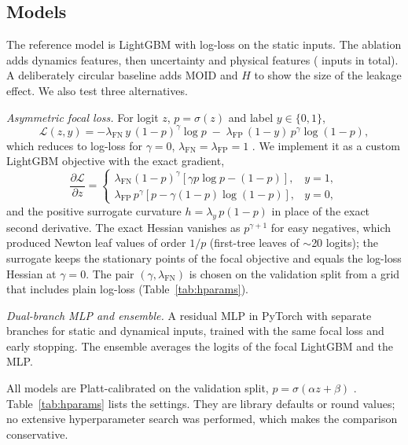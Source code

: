 \documentclass[journal]{IEEEtran}
\begin{document}
\subsection{Models}
The reference model is LightGBM \cite{ke2017} with log-loss on the \NStaticFeat{} static inputs. The ablation adds dynamics features, then uncertainty and physical features (\NFullFeat{} inputs in total). A deliberately circular baseline adds MOID and $H$ to show the size of the leakage effect. We also test three alternatives.

\emph{Asymmetric focal loss.} For logit $z$, $p=\sigma(z)$ and label $y\in\{0,1\}$,
\begin{equation}
\mathcal{L}(z,y) = -\lambda_{\mathrm{FN}}\, y\,(1-p)^{\gamma}\log p \;-\; \lambda_{\mathrm{FP}}\,(1-y)\,p^{\gamma}\log(1-p),
\end{equation}
which reduces to log-loss for $\gamma=0$, $\lambda_{\mathrm{FN}}=\lambda_{\mathrm{FP}}=1$ \cite{lin2017}. We implement it as a custom LightGBM objective with the exact gradient,
\begin{equation}
\frac{\partial\mathcal{L}}{\partial z} =
\begin{cases}
\lambda_{\mathrm{FN}}(1-p)^{\gamma}\left[\gamma p\log p-(1-p)\right], & y=1,\\
\lambda_{\mathrm{FP}}\,p^{\gamma}\left[p-\gamma(1-p)\log(1-p)\right], & y=0,
\end{cases}
\end{equation}
and the positive surrogate curvature $h=\lambda_y\,p(1-p)$ in place of the exact second derivative. The exact Hessian vanishes as $p^{\gamma+1}$ for easy negatives, which produced Newton leaf values of order $1/p$ (first-tree leaves of $\sim$20 logits); the surrogate keeps the stationary points of the focal objective and equals the log-loss Hessian at $\gamma=0$. The pair $(\gamma,\lambda_{\mathrm{FN}})$ is chosen on the validation split from a grid that includes plain log-loss (Table~\ref{tab:hparams}).

\emph{Dual-branch MLP and ensemble.} A residual MLP in PyTorch \cite{paszke2019} with separate branches for static and dynamical inputs, trained with the same focal loss and early stopping. The ensemble averages the logits of the focal LightGBM and the MLP.

All models are Platt-calibrated on the validation split, $p=\sigma(\alpha z+\beta)$ \cite{platt1999}. Table~\ref{tab:hparams} lists the settings. They are library defaults or round values; no extensive hyperparameter search was performed, which makes the comparison conservative.
\end{document}
